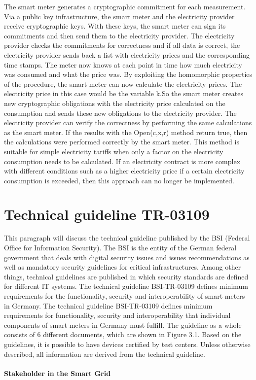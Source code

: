 The smart meter generates a cryptographic commitment for each measurement. Via a public key infrastructure, the smart meter and the electricity provider receive cryptographic keys. With these keys, the smart meter can sign its commitments and then send them to the electricity provider. The electricity provider checks the commitments for correctness and if all data is correct, the electricity provider sends back a list with electricity prices and the corresponding time stamps. The meter now knows at each point in time how much electricity was consumed and what the price was. By exploiting the homomorphic properties of the procedure, the smart meter can now calculate the electricity prices. The electricity price in this case would be the variable k.So the smart meter creates new cryptographic obligations with the electricity price calculated on the consumption and sends these new obligations to the electricity provider. The electricity provider can verify the correctness by performing the same calculations as the smart meter. If the results with the Open(c,x,r) method return true, then the calculations were performed correctly by the smart meter.
This method is suitable for simple electricity tariffs when only a factor on the electricity consumption needs to be calculated. If an electricity contract is more complex with different conditions such as a higher electricity price if a certain electricity consumption is exceeded, then this approach can no longer be implemented.
\section{Technical guideline TR-03109}
This paragraph will discuss the technical guideline published by the BSI (Federal Office for Information Security). The BSI is the entity of the German federal government that deals with digital security issues and issues recommendations as well as mandatory security guidelines for critical infrastructures. Among other things, technical guidelines are published in which security standards are defined for different IT systems. The technical guideline BSI-TR-03109 defines minimum requirements for the functionality, security and interoperability of smart meters in Germany.  The technical guideline BSI-TR-03109 defines minimum requirements for functionality, security and interoperability that individual components of smart meters in Germany must fulfill. The guideline as a whole consists of 6 different documents, which are shown in Figure 3.1. Based on the guidelines, it is possible to have devices certified by test centers. Unless otherwise described, all information are derived from the technical guideline.\\
\\
\textbf{Stakeholder in the Smart Grid}
\\

